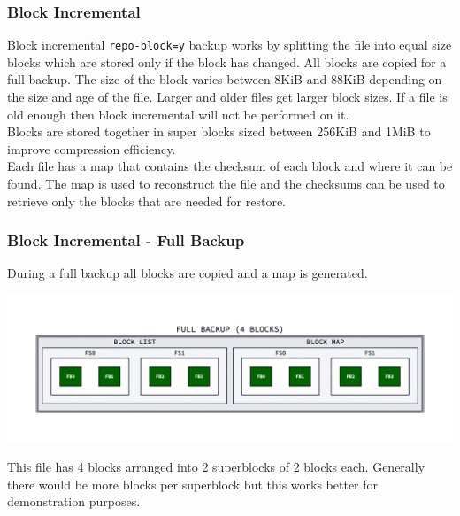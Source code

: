 \begin{frame}[fragile]
    \frametitle{Block Incremental}

    Block incremental \texttt{repo-block=y} backup works by splitting the file into equal size blocks which are stored only if the block has changed. All blocks are copied for a full backup. The size of the block varies between 8KiB and 88KiB depending on the size and age of the file. Larger and older files get larger block sizes. If a file is old enough then block incremental will not be performed on it.
    \\\vspace{1em}
    Blocks are stored together in super blocks sized between 256KiB and 1MiB to improve compression efficiency.
    \\\vspace{1em}
    Each file has a map that contains the checksum of each block and where it can be found. The map is used to reconstruct the file and the checksums can be used to retrieve only the blocks that are needed for restore.
\end{frame}

\begin{frame}[fragile]
    \frametitle{Block Incremental - Full Backup}

    During a full backup all blocks are copied and a map is generated.

    \includegraphics[width=\linewidth]{svg/block-full.png}

    This file has 4 blocks arranged into 2 superblocks of 2 blocks each. Generally there would be more blocks per superblock but this works better for demonstration purposes.
\end{frame}

